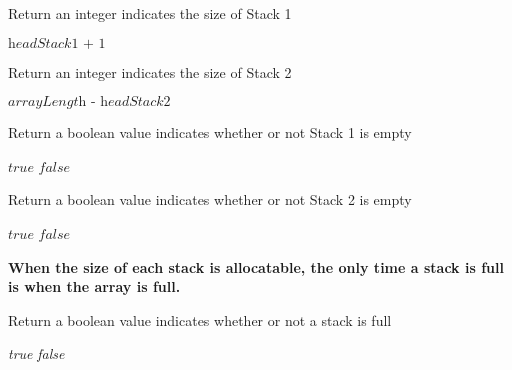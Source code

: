 \documentclass[16pt, letterpaper]{article}
\begin{document}
\begin{algorithm} [H]
\caption{Return an integer indicates the size of Stack 1}
\begin{algorithmic}
    \State \Return $\textit{headStack1 + 1}$
    \EndProcedure
\end{algorithmic}
\end{algorithm}

\begin{algorithm} [H]
\caption{Return an integer indicates the size of Stack 2}
\begin{algorithmic}
    \State \Return $\textit{arrayLength - headStack2}$
    \EndProcedure
\end{algorithmic}
\end{algorithm}

\begin{algorithm} [H]
\caption{Return a boolean value indicates whether or not Stack 1 is empty}
\begin{algorithmic}
    \State \Return $\textit{true}$
    \Else
    \State \Return $\textit{false}$
    \EndIf
    \EndProcedure
\end{algorithmic}
\end{algorithm}

\begin{algorithm} [H]
\caption{Return a boolean value indicates whether or not Stack 2 is empty}
\begin{algorithmic}
    \State \Return $\textit{true}$
    \Else
    \State \Return $\textit{false}$
    \EndIf
    \EndProcedure
\end{algorithmic}
\end{algorithm}

\textbf{When the size of each stack is allocatable, the only time a stack is full is when the array is full.}
\begin{algorithm} [H]
\caption{Return a boolean value indicates whether or not a stack is full}
\begin{algorithmic}
    \State \Return \textit{true}
    \Else
    \State \Return \textit{false}
    \EndIf
    \EndProcedure
\end{algorithmic}
\end{algorithm}
\end{document}
